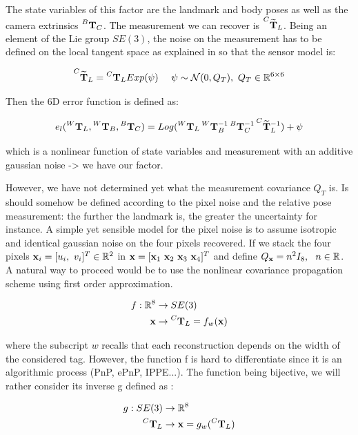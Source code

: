 \documentclass[11pt]{article}
\newcommand{\T}[2]{\prescript{#1}{}{\bfT}_{#2}}
\newcommand{\Tm}[2]{\prescript{#1}{}{\widetilde{\bfT}}_{#2}}
\newcommand{\Gaussian}[2]{\mathcal{N}({#1},{#2})}
\newcommand{\Reals}{\mathbb{R}}
\begin{document}
The state variables of this factor are the landmark and body poses as well as the camera extrinsics $\T{B}{C}$. The measurement we can recover is $\Tm{C}{L}$. Being an element of the Lie group $SE(3)$, the noise on the measurement has to be defined on the local tangent space as explained in \cite{barfoot2017state} so that the sensor model is:

\begin{equation}
    \Tm{C}{L} = \T{C}{L}Exp(\psi) ~~~~ \psi \sim \Gaussian{0}{Q_T}, ~Q_T \in \Reals^{6\times6}
\end{equation}

Then the 6D error function is defined as:

\begin{equation}
    e_{l}(\T{W}{L}, \T{W}{B}, \T{B}{C}) = Log(\T{W}{L} \T{W}{B}^{-1} \T{B}{C}^{-1} \Tm{C}{L}^{-1}) + \psi
\end{equation}

which is a nonlinear function of state variables and measurement with an additive gaussian noise -> we have our factor.

However, we have not determined yet what the measurement covariance $Q_T$ is. Is should somehow be defined according to the pixel noise and the relative pose measurement: the further the landmark is, the greater the uncertainty for instance. A simple yet sensible model for the pixel noise is to assume isotropic and identical gaussian noise on the four pixels recovered. If we stack the four pixels $\bfx_i = [u_i,~v_i]^T \in \Reals^{2}$ in ${\bf x} = [{\bf x}_1 ~{\bf x}_2~ {\bf x}_3~ {\bf x}_4]^T$ and define $Q_{\bfx} = n^2 I_8, ~~n \in \Reals$.
A natural way to proceed would be to use the nonlinear covariance propagation scheme using first order approximation.

\begin{equation}
    \begin{split}
        f: \Reals^8 &\rightarrow SE(3) \\
                           \bfx &\rightarrow \T{C}{L} = f_w(\bfx)
    \end{split}
\end{equation}

where the subscript $w$ recalls that each reconstruction depends on the width of the considered tag. 
However, the function f is hard to differentiate since it is an algorithmic process (PnP, ePnP, IPPE...). The function being bijective, we will rather consider its inverse g defined as :

\begin{equation}
    \begin{split}
        g: SE(3) &\rightarrow \Reals^8 \\
                           \T{C}{L} &\rightarrow \bfx = g_w(\T{C}{L})
    \end{split}
\end{equation}
\end{document}
